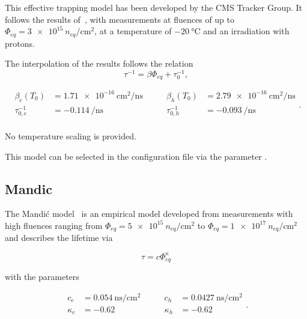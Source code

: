 This effective trapping model has been developed by the CMS Tracker Group.
It follows the results of~\cite{CMSTrackerTrapping}, with measurements at fluences of up to $\Phi_{eq} = \SI{3e15}{n_{eq} \per \cm^2}$, at a temperature of $\SI{-20}{\celsius}$ and an irradiation with protons.

The interpolation of the results follows the relation
\begin{equation*}
    \tau^{-1} = {\beta\Phi_{eq}} + \tau_0^{-1} ,
\end{equation*}

\begin{equation*}
    \begin{split}
        \beta_{e}(T_0) &= \SI{1.71e-16}{\cm^2 \per \ns} \\
        \tau_{0,e}^{-1}   &= \SI{-0.114}{\per \ns} \\
    \end{split}
    \qquad
    \begin{split}
        \beta_{h}(T_0) &= \SI{2.79e-16}{\cm^2 \per \ns} \\
        \tau_{0,h}^{-1}   &= \SI{-0.093}{\per \ns} \\
    \end{split}.
\end{equation*}

No temperature scaling is provided.

This model can be selected in the configuration file via the parameter .

\subsection{Mandic}

The Mandi\'{c} model~\cite{Mandic} is an empirical model developed from measurements with high fluences ranging from  $\Phi_{eq} = \SI{5e15}{n_{eq} \per \cm^2}$ to  $\Phi_{eq} = \SI{1e17}{n_{eq} \per \cm^2}$ and describes the lifetime via

\begin{equation*}
    \tau = c\Phi_{eq}^{\kappa}
\end{equation*}

with the parameters

\begin{equation*}
    \begin{split}
        c_e &= \SI{0.054}{\ns \per \cm^2} \\
        \kappa_e   &= -0.62 \\
    \end{split}
    \qquad
    \begin{split}
        c_h &= \SI{0.0427}{\ns \per \cm^2} \\
        \kappa_h   &= -0.62 \\
    \end{split}.
\end{equation*}

